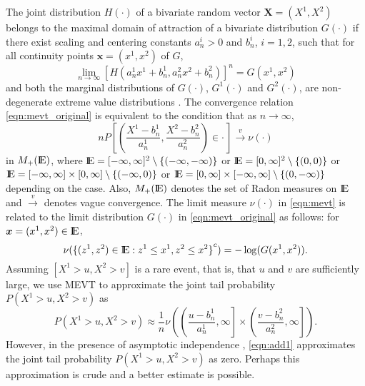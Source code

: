 \documentclass[11 pt]{amsart}
\numberwithin{equation}{section}
\begin{document}
The joint distribution $H(\cdot)$ of a bivariate random vector ${\boldsymbol X}
= (X^1, X^2)$ belongs to {the} maximal domain of attraction of a bivariate distribution
$G(\cdot)$  if there exist scaling and centering constants
$a_n^i>0$ and $b_n^i$, $i=1,2$,  such that 
for all
continuity points ${\boldsymbol x} = (x^1, x^2)$ of $G$,
 \begin{equation}\label{eqn:mevt_original}
 \lim_{n \to \infty} { \left[ H(a^1_n x^1 + b^1_n , a^2_n x^2 +
 b^2_n )\right]}^n = G(x^1, x^2)
\end{equation}
and both the marginal distributions of $G(\cdot)$, $G^1(\cdot)$ and
$G^2(\cdot)$, are non-degenerate extreme value distributions
\cite[page 208]{dehaan:ferreira:2006}. The convergence relation
\eqref{eqn:mevt_original} is equivalent to the condition that as $n
\to \infty$, 
\begin{equation}\label{eqn:mevt}
n P\left[ \left( \frac{X^1 - b^1_n}{a^1_n}, \frac{X^2 -
 b^2_n}{a^2_n} \right) \in \cdot \,\right] \stackrel{v}{\rightarrow} \nu(\cdot)
\end{equation}
in $M_+({\mathop{\rm I\kern -0.20em E}\nolimits})$, where ${\mathop{\rm I\kern -0.20em E}\nolimits} = [-\infty, \infty]^2	 \setminus \{
(-\infty, -\infty)\}$ or ${\mathop{\rm I\kern -0.20em E}\nolimits} = [0, \infty]^2 \setminus \{ (0, 0)\}$ or
${\mathop{\rm I\kern -0.20em E}\nolimits} = [-\infty, \infty] \times [0, \infty] \setminus \{ (-\infty, 0)
\}$ or ${\mathop{\rm I\kern -0.20em E}\nolimits} = [0, \infty] \times [-\infty, \infty] \setminus \{ (0,
-\infty) \}$ depending on the {case.}
{Also}, $M_+({\mathop{\rm I\kern -0.20em E}\nolimits})$ denotes the set of Radon measures on ${\mathop{\rm I\kern -0.20em E}\nolimits}$ and
$\stackrel{v}{\rightarrow}$ denotes vague convergence. The limit
measure $\nu(\cdot)$ in \eqref{eqn:mevt} is related to the limit
distribution $G(\cdot)$ in \eqref{eqn:mevt_original} as follows: for
${\boldsymbol x} = (x^1, x^2) \in {\mathop{\rm I\kern -0.20em E}\nolimits}$, 
\begin{equation}\label{eqn:nuandG}
\nu( {\{(z^1, z^2) \in {\mathop{\rm I\kern -0.20em E}\nolimits}: z^1 \le x^1, z^2 \le x^2\} }^c ) = -\log(G(x^1, x^2)).
\end{equation} 
Assuming  $[X^1 > u, X^2 > v ]$ is a rare event, that is, that $u$ and
$v$ are sufficiently large, we use MEVT to
approximate the joint tail probability $P( X^1 > u, X^2 
> v)$  as
\begin{equation}\label{eqn:add1}
 P( X^1 > u, X^2 > v) \approx \frac1{n} \nu\left( \left(\frac{u- b^1_n}{a^1_n}, \infty \right] \times \left(\frac{v- b^2_n}{a^2_n}, \infty \right] \right).
 \end{equation}
However, in the presence of asymptotic independence \cite[page
226]{dehaan:ferreira:2006}, \eqref{eqn:add1}  approximates the joint tail probability
$P( X^1 > u, X^2 > v)$ as zero. Perhaps this approximation is
crude and a better estimate is possible.
\end{document}
